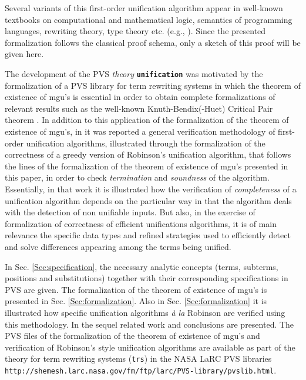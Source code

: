 \documentclass[submission,copyright,creativecommons]{eptcs}
\begin{document}
Several variants of this first-order unification algorithm appear in
well-known textbooks on computational and mathematical logic,
semantics of programming languages, rewriting theory, type theory
etc. (e.g., \cite{Llo87,EbFlTh84,Bu98,Te2003,BaNi98, Hi97}). Since the
presented formalization follows the classical proof schema, only a
sketch of this proof will be given here.

The development of the PVS \emph{theory} {\tt \bf unification} was
motivated by the formalization of a PVS library for term rewriting
systems \cite{GaAR2008b} in which the theorem of existence of
mgu's is essential in order to obtain complete
formalizations of relevant results such as the well-known
Knuth-Bendix(-Huet) Critical Pair theorem \cite{GaAR2010}.  In
addition to this application of the formalization of the theorem of
existence of mgu's, in \cite{AMARG2010} it was reported a general
verification methodology of first-order unification algorithms,
illustrated through the formalization of the correctness of a greedy
version of Robinson's unification algorithm, that follows the lines of
the formalization of the theorem of existence of mgu's presented in
this paper, in order to check \emph{termination} and \emph{soundness}
of the algorithm. Essentially, in that work it is illustrated how the
verification of \emph{completeness} of a unification algorithm depends
on the particular way in that the algorithm deals with the detection
of non unifiable inputs. But also, in the exercise of formalization of
correctness of efficient unifications algorithms, it is of main
relevance the specific data types and refined strategies used to
efficiently detect and solve differences appearing among the terms
being unified.

In Sec. \ref{Sec:specification}, the necessary analytic concepts
(terms, subterms, positions and substitutions) together with their
corresponding specifications in PVS are given. The formalization of
the theorem of existence of mgu's is presented in
Sec. \ref{Sec:formalization}. Also in Sec.  \ref{Sec:formalization} it
is illustrated how specific unification algorithms {\em \`a la}
Robinson are verified using this methodology. In the sequel related
work and conclusions are presented. The PVS files of the formalization
of the theorem of existence of mgu's and verification of Robinson's
style unification algorithms are available as part of the theory for
term rewriting systems ({\tt trs}) in the NASA LaRC PVS libraries
{\small\tt
  http://shemesh.larc.nasa.gov/fm/ftp/larc/PVS-library/pvslib.html}.
\end{document}
